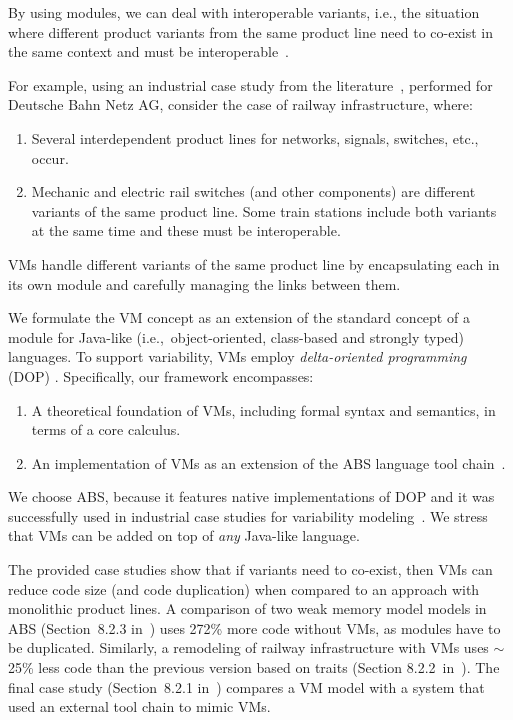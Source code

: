 \documentclass[runningheads]{llncs}
\begin{document}
By using modules, we can deal with interoperable variants, i.e., the situation where 
different product variants from the same product line need to co-exist
in the same context and must be interoperable~\cite{DamianiHKL18b}.

For example, using an industrial case study from the
literature~\cite{KHS18}, %
performed for Deutsche Bahn Netz AG, consider the case of railway infrastructure, where:
\begin{enumerate}
\item Several interdependent product lines for networks, signals,
switches, etc., occur.
\item Mechanic and electric rail switches (and other components) are different
variants of the same product line.  Some train stations include
both variants at the same time and these must be interoperable.
\end{enumerate}

VMs handle different variants of the same product line by encapsulating each in its own module and carefully managing the links between them.

We formulate the VM concept as an extension of the standard concept of
a module for Java-like (i.e.,\ object-oriented, class-based and strongly
typed) languages.  To support variability, VMs employ
\emph{delta-oriented programming}
(DOP) \cite{DOP}.
Specifically, our framework encompasses:
% 
\begin{enumerate}
\item A theoretical foundation of VMs, including formal syntax and
semantics, in terms of a core calculus.
\item An implementation of VMs as an extension of the ABS
language tool chain~\cite{Haehnle13,abs}.
\end{enumerate}
      
We choose ABS, because it features native implementations of DOP and it
was successfully used in industrial case studies for variability
modeling~\cite{KHS18,MSAA17,WongDS11}.  We stress that VMs can be
added on top of \emph{any} Java-like language. 

The provided case studies show that if variants need to co-exist, then VMs can reduce code size (and code duplication) when compared to an approach with monolithic product lines.
A comparison of two weak memory model models in ABS (Section~8.2.3 in~\cite{new}) uses 272\% more code without VMs, as modules have to be duplicated.
Similarly, a remodeling of railway infrastructure with VMs uses $\sim$25\% less code than the previous version based on traits (Section 8.2.2~in~\cite{new}).
The final case study (Section~8.2.1 in~\cite{new}) compares a VM model with a system that used an external tool chain to mimic VMs. 
\end{document}
